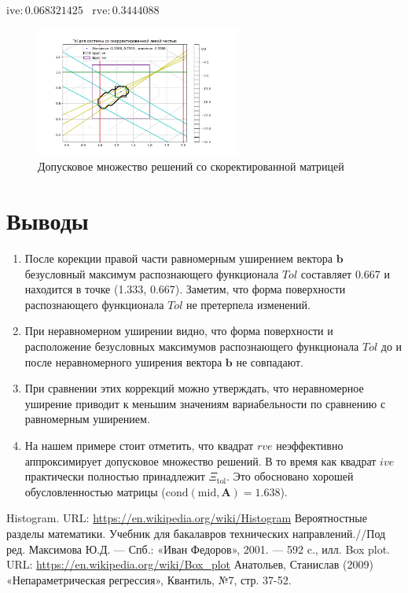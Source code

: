 \documentclass[a4paper,14pt]{article}
\begin{document}
	$\mathrm{ive}: 0.068321425 \;\;\;\mathrm{rve}: 0.3444088$
	\begin{figure}[H] \label{MatrixCorrSet}
		\centering
		\includegraphics[width=0.6\textwidth]{../src/pic/left_bliz.png}
		\caption{Допусковое множество решений со скоректированной матрицей} 
	\end{figure}

	
	\section{Выводы}
	\begin{enumerate}
		\item После корекции правой части равномерным уширением вектора $\textbf{b}$ безусловный максимум распознающего функционала $Tol$ составляет 0.667 и находится в точке (1.333, 0.667). Заметим, что форма поверхности распознающего функционала $Tol$ не претерпела изменений.
		\item При неравномерном уширении видно, что форма поверхности и расположение безусловных максимумов распознающего функционала $Tol$ до и после неравномерного уширения вектора $\textbf{b}$ не совпадают.
		\item При сравнении этих коррекций можно утверждать, что неравномерное уширение приводит к меньшим значениям вариабельности по сравнению с равномерным уширением.
		\item На нашем примере стоит отметить, что квадрат $rve$ неэффективно аппроксимирует допусковое множество решений. В то время как квадрат $ive$ практически полностью принадлежит $\Xi_{\mathrm{tol}}$. Это обосновано хорошей обусловленностью матрицы ($\mathrm{cond}(\mathrm{mid},\mathbf{A})=1.638$).
	\end{enumerate}
	
	\newpage
	
	\begin{thebibliography}{4}
		Histogram. URL: \url{https://en.wikipedia.org/wiki/Histogram}
		Вероятностные разделы математики. Учебник для бакалавров технических направлений.//Под ред. Максимова Ю.Д. --- Спб.: «Иван Федоров», 2001. --- 592 c., илл.
		Box plot. URL: \url{https://en.wikipedia.org/wiki/Box_plot}
		Анатольев, Станислав (2009) «Непараметрическая регрессия», Квантиль, №7, стр. 37-52.
	\end{thebibliography}
	
\end{document}
